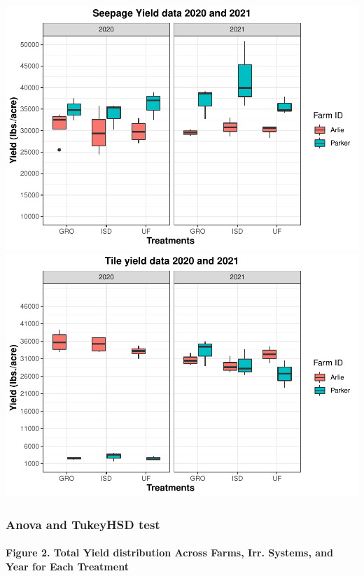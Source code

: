 \documentclass[
]{article}
\begin{document}
\includegraphics{NoffsiteT_files/figure-latex/unnamed-chunk-2-1.pdf}
\includegraphics{NoffsiteT_files/figure-latex/unnamed-chunk-2-2.pdf}

\hypertarget{anova-and-tukeyhsd-test}{%
\subsubsection{\texorpdfstring{\textbf{Anova and TukeyHSD
test}}{Anova and TukeyHSD test}}\label{anova-and-tukeyhsd-test}}

\hypertarget{figure-2.-total-yield-distribution-across-farms-irr.-systems-and-year-for-each-treatment}{%
\paragraph{\texorpdfstring{\textbf{Figure 2.} Total Yield distribution
Across Farms, Irr. Systems, and Year for Each
Treatment}{Figure 2. Total Yield distribution Across Farms, Irr. Systems, and Year for Each Treatment}}\label{figure-2.-total-yield-distribution-across-farms-irr.-systems-and-year-for-each-treatment}}
\end{document}
